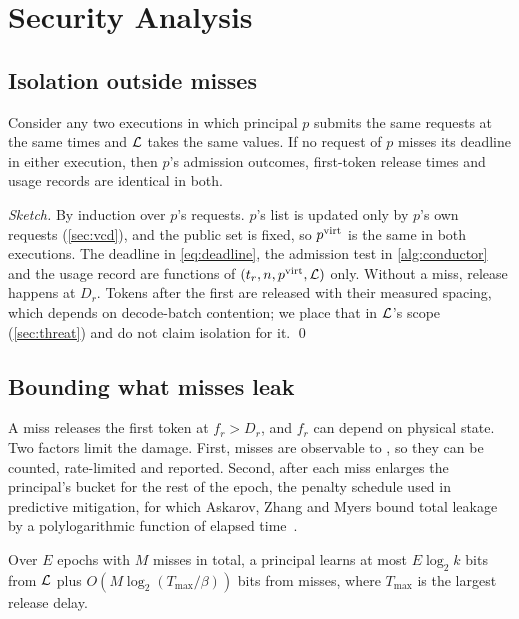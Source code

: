 \section{Security Analysis}
\label{sec:security}


\subsection{Isolation outside misses}
\begin{proposition}[sketch]
\label{prop:oi}
Consider any two executions in which principal $p$ submits the same requests at
the same times and $\mathcal{L}$ takes the same values. If no request of $p$ misses its
deadline in either execution, then $p$'s admission outcomes, first-token release
times and usage records are identical in both.
\end{proposition}

\noindent\emph{Sketch.} By induction over $p$'s requests. $p$'s \vcd list is
updated only by $p$'s own requests (\cref{sec:vcd}), and the public set is
fixed, so $p^{\mathrm{virt}}$ is the same in both executions. The deadline in
\cref{eq:deadline}, the admission test in \cref{alg:conductor} and the usage
record are functions of $(t_r, n, p^{\mathrm{virt}}, \mathcal{L})$ only. Without a miss, release
happens at $D_r$. Tokens after the first are released with their measured
spacing, which depends on decode-batch contention; we place that in $\mathcal{L}$'s
scope (\cref{sec:threat}) and do not claim isolation for it. \qed

\subsection{Bounding what misses leak}
A miss releases the first token at $f_r > D_r$, and $f_r$ can depend on
physical state. Two factors limit the damage. First, misses are observable to
\sys, so they can be counted, rate-limited and reported. Second, after each
miss \sys enlarges the principal's bucket for the rest of the epoch, the
penalty schedule used in predictive mitigation, for which Askarov, Zhang and
Myers bound total leakage by a polylogarithmic function of elapsed
time~\cite{askarov2010predictive,zhang2011predictive}.

\begin{conjecture}
\label{conj:bound}
Over $E$ epochs with $M$ misses in total, a principal learns at most
$E\log_2 k$ bits from $\mathcal{L}$ plus $O(M \log_2 (T_{\max}/\beta))$ bits from
misses, where $T_{\max}$ is the largest release delay.
\end{conjecture}

